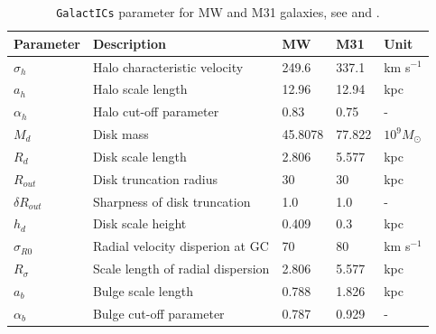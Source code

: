 \documentclass[a4paper,12pt, english]{article}
\begin{document}
\begin{table}[]
\begin{tabular}{l|l|l|l|l}
Parameter          & Description                       & MW      & M31    & Unit               \\ \hline
\(\sigma_{h}\)     & Halo characteristic velocity      & 249.6   & 337.1  & km s\(^{-1}\)      \\
\(a_{h}\)          & Halo scale length                 & 12.96   & 12.94  & kpc                \\
\(\alpha_{h}\)      & Halo cut-off parameter            & 0.83    & 0.75   & -                  \\
\(M_{d}\)          & Disk mass                         & 45.8078 & 77.822 & \(10^9 M_{\odot}\) \\
\(R_{d}\)          & Disk scale length                 & 2.806   & 5.577  & kpc                \\
\(R_{out}\)        & Disk truncation radius            & 30      & 30     & kpc                \\
\(\delta R_{out}\) & Sharpness of disk truncation           & 1.0     & 1.0    & -                  \\
\(h_{d}\)          & Disk scale height                 & 0.409   & 0.3    & kpc                \\
\(\sigma_{R0}\)    & Radial velocity disperion at GC   & 70      & 80     & km s\(^{-1}\)      \\
\(R_{\sigma}\)     & Scale length of radial dispersion & 2.806   & 5.577  & kpc                \\
\(a_{b}\)          & Bulge scale length                & 0.788   & 1.826  & kpc                \\
\(\alpha_{b}\)     & Bulge cut-off parameter           & 0.787   & 0.929  & -                  \\ \hline 
\end{tabular}
\caption{\texttt{GalactICs} parameter for MW and M31 galaxies, see \textcite{Widrow_2005} and \textcite{Withagen_2019}.}
\label{gal-param}
\end{table}
\smallskip
\end{document}
